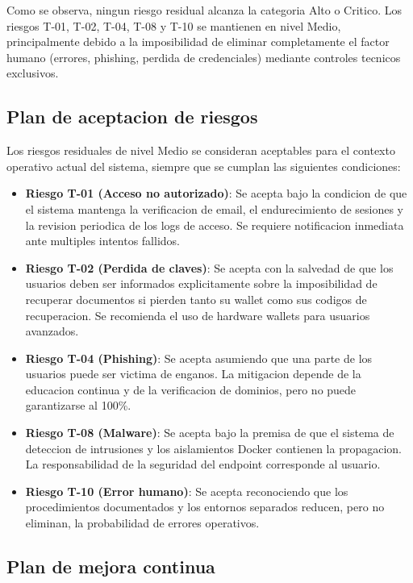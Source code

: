 \documentclass[11pt, a4paper]{article}
\begin{document}
Como se observa, ningun riesgo residual alcanza la categoria Alto o Critico. Los riesgos T-01, T-02, T-04, T-08 y T-10 se mantienen en nivel Medio, principalmente debido a la imposibilidad de eliminar completamente el factor humano (errores, phishing, perdida de credenciales) mediante controles tecnicos exclusivos.

\subsection{Plan de aceptacion de riesgos}

Los riesgos residuales de nivel Medio se consideran aceptables para el contexto operativo actual del sistema, siempre que se cumplan las siguientes condiciones:

\begin{itemize}
    \item \textbf{Riesgo T-01 (Acceso no autorizado)}: Se acepta bajo la condicion de que el sistema mantenga la verificacion de email, el endurecimiento de sesiones y la revision periodica de los logs de acceso. Se requiere notificacion inmediata ante multiples intentos fallidos.
    \item \textbf{Riesgo T-02 (Perdida de claves)}: Se acepta con la salvedad de que los usuarios deben ser informados explicitamente sobre la imposibilidad de recuperar documentos si pierden tanto su wallet como sus codigos de recuperacion. Se recomienda el uso de hardware wallets para usuarios avanzados.
    \item \textbf{Riesgo T-04 (Phishing)}: Se acepta asumiendo que una parte de los usuarios puede ser victima de enganos. La mitigacion depende de la educacion continua y de la verificacion de dominios, pero no puede garantizarse al 100\%.
    \item \textbf{Riesgo T-08 (Malware)}: Se acepta bajo la premisa de que el sistema de deteccion de intrusiones y los aislamientos Docker contienen la propagacion. La responsabilidad de la seguridad del endpoint corresponde al usuario.
    \item \textbf{Riesgo T-10 (Error humano)}: Se acepta reconociendo que los procedimientos documentados y los entornos separados reducen, pero no eliminan, la probabilidad de errores operativos.
\end{itemize}

\subsection{Plan de mejora continua}
\end{document}
